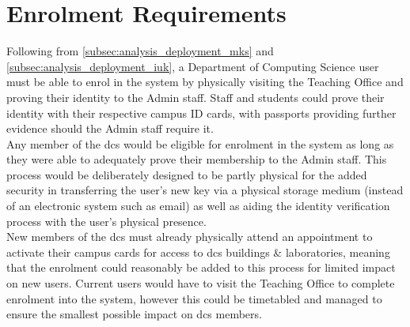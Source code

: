 \section{Enrolment Requirements}
\label{sec:analysis_enrolment}

Following from \cref{subsec:analysis_deployment_mks} and \cref{subsec:analysis_deployment_iuk}, a Department of Computing Science user must be able to enrol in the \theResServer system by physically visiting the Teaching Office and proving their identity to the Admin staff. Staff and students could prove their identity with their respective campus ID cards, with passports providing further evidence should the Admin staff require it.\\
Any member of the \acrfull{dcs} would be eligible for enrolment in the system as long as they were able to adequately prove their membership to the Admin staff. This process would be deliberately designed to be partly physical for the added security in transferring the user's new key via a physical storage medium (instead of an electronic system such as email) as well as aiding the identity verification process with the user's physical presence.\\
New members of the \acrshort{dcs} must already physically attend an appointment to activate their campus cards for access to \acrshort{dcs} buildings \& laboratories, meaning that the \theResServer enrolment could reasonably be added to this process for limited impact on new users. Current users would have to visit the Teaching Office to complete enrolment into the system, however this could be timetabled and managed to ensure the smallest possible impact on \acrshort{dcs} members.

